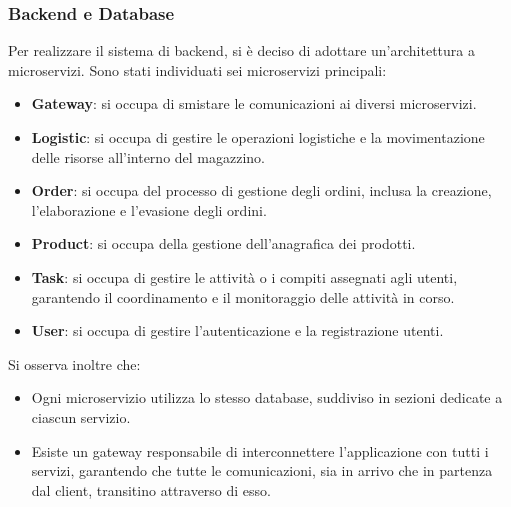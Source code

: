 \subsubsection{Backend e Database}
Per realizzare il sistema di backend, si è deciso di adottare un’architettura a microservizi. Sono stati individuati sei microservizi principali:

\begin{itemize}
    \item \textbf{Gateway}: si occupa di smistare le comunicazioni ai diversi microservizi.
    \item \textbf{Logistic}: si occupa di gestire le operazioni logistiche e la movimentazione delle risorse all'interno del magazzino.
    \item \textbf{Order}: si occupa del processo di gestione degli ordini, inclusa la creazione, l'elaborazione e l'evasione degli ordini.
    \item \textbf{Product}: si occupa della gestione dell'anagrafica dei prodotti.
    \item \textbf{Task}: si occupa di gestire le attività o i compiti assegnati agli utenti, garantendo il coordinamento e il monitoraggio delle attività in corso.
    \item \textbf{User}: si occupa di gestire l'autenticazione e la registrazione utenti.
\end{itemize}

Si osserva inoltre che:
\begin{itemize}
    \item Ogni microservizio utilizza lo stesso database, suddiviso in sezioni dedicate a ciascun servizio.
    \item Esiste un gateway responsabile di interconnettere l'applicazione con tutti i servizi, garantendo che tutte le comunicazioni, sia in arrivo che in partenza dal client, transitino attraverso di esso.
\end{itemize}

